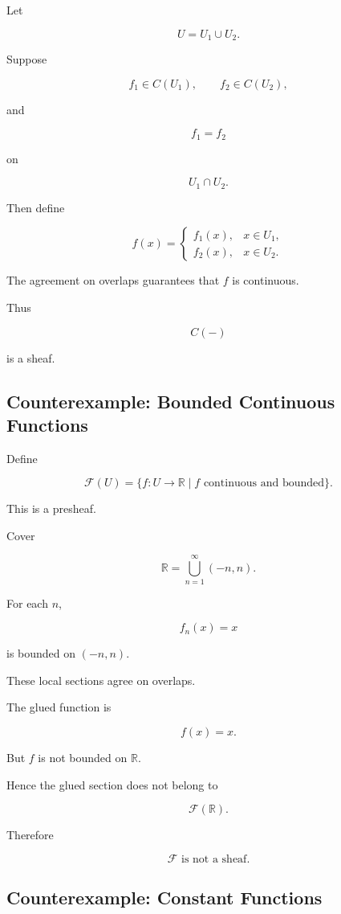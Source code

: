 \documentclass[12pt,a4paper]{article}
\theoremstyle{notespace}
\begin{document}
Let

\[
U=U_1\cup U_2.
\]

Suppose

\[
f_1\in C(U_1),
\qquad
f_2\in C(U_2),
\]

and

\[
f_1=f_2
\]

on

\[
U_1\cap U_2.
\]

Then define

\[
f(x)=
\begin{cases}
	f_1(x), & x\in U_1,\\
	f_2(x), & x\in U_2.
\end{cases}
\]

The agreement on overlaps guarantees that \(f\) is continuous.

Thus

\[
C(-)
\]

is a sheaf.

\subsection{Counterexample: Bounded Continuous Functions}

Define

\[
\mathcal F(U)
=
\{f:U\to\mathbb R \mid f
\text{ continuous and bounded}\}.
\]

This is a presheaf.

Cover

\[
\mathbb R
=
\bigcup_{n=1}^{\infty}
(-n,n).
\]

For each \(n\),

\[
f_n(x)=x
\]

is bounded on \((-n,n)\).

These local sections agree on overlaps.

The glued function is

\[
f(x)=x.
\]

But \(f\) is not bounded on \(\mathbb R\).

Hence the glued section does not belong to

\[
\mathcal F(\mathbb R).
\]

Therefore

\[
\boxed{\mathcal F \text{ is not a sheaf.}}
\]

\subsection{Counterexample: Constant Functions}
\end{document}
